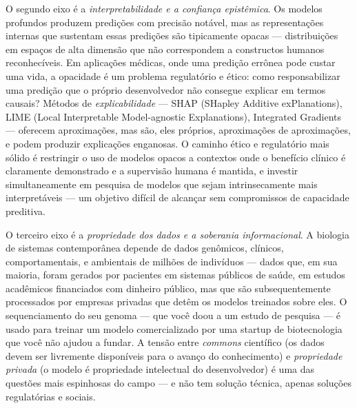 O segundo eixo é a \emph{interpretabilidade e a confiança epistêmica}. Os modelos profundos produzem predições com precisão notável, mas as representações internas que sustentam essas predições são tipicamente opacas --- distribuições em espaços de alta dimensão que não correspondem a constructos humanos reconhecíveis. Em aplicações médicas, onde uma predição errônea pode custar uma vida, a opacidade é um problema regulatório e ético: como responsabilizar uma predição que o próprio desenvolvedor não consegue explicar em termos causais? Métodos de \emph{explicabilidade} --- SHAP (SHapley Additive exPlanations), LIME (Local Interpretable Model-agnostic Explanations), Integrated Gradients --- oferecem aproximações, mas são, eles próprios, aproximações de aproximações, e podem produzir explicações enganosas. O caminho ético e regulatório mais sólido é restringir o uso de modelos opacos a contextos onde o benefício clínico é claramente demonstrado e a supervisão humana é mantida, e investir simultaneamente em pesquisa de modelos que sejam intrinsecamente mais interpretáveis --- um objetivo difícil de alcançar sem compromissos de capacidade preditiva.

O terceiro eixo é a \emph{propriedade dos dados e a soberania informacional}. A biologia de sistemas contemporânea depende de dados genômicos, clínicos, comportamentais, e ambientais de milhões de indivíduos --- dados que, em sua maioria, foram gerados por pacientes em sistemas públicos de saúde, em estudos acadêmicos financiados com dinheiro público, mas que são subsequentemente processados por empresas privadas que detêm os modelos treinados sobre eles. O sequenciamento do seu genoma --- que você doou a um estudo de pesquisa --- é usado para treinar um modelo comercializado por uma startup de biotecnologia que você não ajudou a fundar. A tensão entre \emph{commons} científico (os dados devem ser livremente disponíveis para o avanço do conhecimento) e \emph{propriedade privada} (o modelo é propriedade intelectual do desenvolvedor) é uma das questões mais espinhosas do campo --- e não tem solução técnica, apenas soluções regulatórias e sociais.



